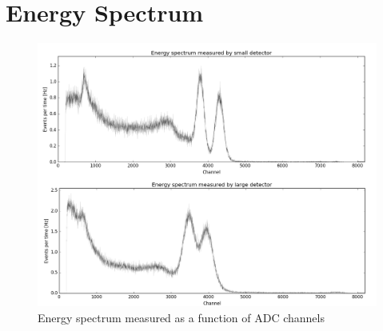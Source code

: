 \documentclass[a4paper,parskip,11pt, DIV12]{scrreprt}
\begin{document}
\section{Energy Spectrum}
%
\begin{figure}[H]
\centering
\includegraphics[scale=0.35]{EnergyRaw.png}
\caption[EnergyRaw]{Energy spectrum measured as a function of ADC channels}
\label{fig:EnergyRaw}
\end{figure}
\end{document}
